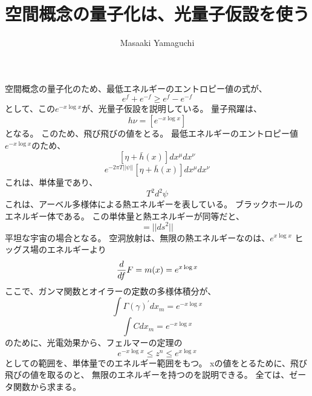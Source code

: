 \documentclass{jsarticle}
\begin{document}
\title{空間概念の量子化は、光量子仮設を使う}
\author{Masaaki Yamaguchi}
\date{}
\maketitle


    空間概念の量子化のため、最低エネルギーのエントロピー値の式が、
    $$ e^{f} + e^{-f} \ge e^{f} - e^{-f} $$
    として、この$e^{-x \log x}$が、光量子仮設を説明している。
    量子飛躍は、
    $$ h\nu = [e^{-x \log x}]$$となる。
    このため、飛び飛びの値をとる。
    最低エネルギーのエントロピー値$e^{-x \log x}$のため、
    $$ [\eta + \bar{h}(x)]dx^{\mu}dx^{\nu} $$
    $$ e^{-2\pi T||\psi||} [\eta + \bar{h}(x)]dx^{\mu}dx^{\nu} $$
    これは、単体量であり、
    $$T^2d^2 \psi$$
    これは、アーベル多様体による熱エネルギーを表している。
    ブラックホールのエネルギー体である。
    この単体量と熱エネルギーが同等だと、
    $$ = ||ds^2||$$
    平坦な宇宙の場合となる。
    空洞放射は、無限の熱エネルギーなのは、$e^{x \log x}$
    ヒッグス場のエネルギーより
    $$ {d \over df}F = m(x) = e^{x \log x} $$
    ここで、ガンマ関数とオイラーの定数の多様体積分が、
    $$ \int \Gamma(\gamma)^{'}dx_m = e^{-x \log x}$$
    $$ \int Cdx_m = e^{-x \log x} $$
    のために、光電効果から、フェルマーの定理の
    $$ e^{-x \log x} \le z^n \le e^{x \log x}$$
    としての範囲を、単体量でのエネルギー範囲をもつ。
    xの値をとるために、飛び飛びの値を取るのと、
    無限のエネルギーを持つのを説明できる。
    全ては、ゼータ関数から求まる。
    　
\end{document}
